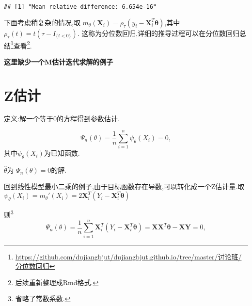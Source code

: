 \documentclass[]{ctexbook}
\newenvironment{Shaded}{\begin{snugshade}}{\end{snugshade}}
\newcommand{\DataTypeTok}[1]{\textcolor[rgb]{0.13,0.29,0.53}{#1}}
\newcommand{\DecValTok}[1]{\textcolor[rgb]{0.00,0.00,0.81}{#1}}
\newcommand{\FloatTok}[1]{\textcolor[rgb]{0.00,0.00,0.81}{#1}}
\newcommand{\KeywordTok}[1]{\textcolor[rgb]{0.13,0.29,0.53}{\textbf{#1}}}
\newcommand{\NormalTok}[1]{#1}
\newcommand{\OperatorTok}[1]{\textcolor[rgb]{0.81,0.36,0.00}{\textbf{#1}}}
\renewcommand{\href}[2]{#2\footnote{\url{#1}}}
\begin{document}
\begin{Shaded}
\end{Shaded}

\begin{verbatim}
## [1] "Mean relative difference: 6.654e-16"
\end{verbatim}

下面考虑稍复杂的情况,取
\(m_{\theta}\left(\boldsymbol{X}_{i}\right)=\rho_{\tau}\left(y_{i}-\boldsymbol{X}_{i}^{T} \boldsymbol{\theta}\right)\),其中
\(\rho_{\tau}(t)=t\left(\tau-I_{\{t<0\}}\right)\).
这称为分位数回归,详细的推导过程可以在\href{https://github.com/dujiangbjut/dujiangbjut.github.io/tree/master/讨论班/分位数回归}{分位数回归总结}查看\footnote{后续重新整理成Rmd格式.}.

\textbf{这里缺少一个M估计迭代求解的例子}

\hypertarget{z}{%
\section{Z估计}\label{z}}

定义:解一个等于0的方程得到参数估计.

\[
\Psi_{n}(\theta)=\frac{1}{n} \sum_{i=1}^{n} \psi_{\theta}\left(X_{i}\right)=0,
\]
其中\(\psi_{\theta}\left(X_{i}\right)\)为已知函数.

\(\hat{\theta}\)为
\(\Psi_{n}(\theta)=0\)的解.

回到线性模型最小二乘的例子,由于目标函数存在导数,可以转化成一个Z估计量.取
\(\psi_{\theta}\left(X_{i}\right)=m_{\theta}'\left(X_{i}\right)=2\boldsymbol{X}_{i}^{T} \left(Y_{i}-\boldsymbol{X}_{i}^{T} \boldsymbol{\theta}\right)\)

则\footnote{省略了常数系数.}
\[
\Psi_{n}(\theta)=\frac{1}{n} \sum_{i=1}^{n}\boldsymbol{X}_{i}^{T}  \left(Y_{i}-\boldsymbol{X}_{i}^{T} \boldsymbol{\theta}\right) =\boldsymbol{X} \boldsymbol{X}^{T} \boldsymbol{\theta}-\boldsymbol{X} \boldsymbol{Y}=0,
\]
\end{document}
